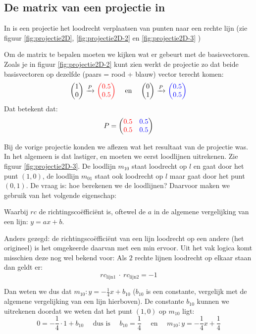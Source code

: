 \subsection{De matrix van een projectie in \RT} \label{projectie2D}
In \RT is een projectie  het loodrecht verplaatsen van punten   naar een rechte lijn (zie figuur \ref{fig:projectie2D},  \ref{fig:projectie2D-2} en \ref{fig:projectie2D-3} ) 


Om de matrix te bepalen moeten we kijken wat er gebeurt met de basisvectoren. 	
Zoals je in figuur \ref{fig:projectie2D-2} kunt zien werkt de projectie zo dat beide basisvectoren op dezelfde (paars = rood + blauw) vector terecht komen:
\[
    \vectwee{1}{0} \ \xrightarrow{P} \ \vectwee[red]{0.5}{0.5} \quad \text{ en } \quad 
    \vectwee{0}{1} \ \xrightarrow{P} \ \vectwee[blue]{0.5}{0.5}
\]
Dat betekent dat: \[P = \begin{pmatrix} {\color{red}0.5}&{\color{blue}0.5} \\ {\color{red}0.5}&{\color{blue}0.5} \end{pmatrix} \]

\newpage
{}

Bij de vorige projectie konden we aflezen wat het resultaat van de projectie was. In het algemeen is dat lastiger, en moeten we eerst loodlijnen uitrekenen. Zie figuur  \ref{fig:projectie2D-3}. De loodlijn $ m_{10} $ staat loodrecht op $l$ en gaat door het punt $(1,0)$, de loodlijn $m_{01}$ staat ook loodrecht op $l$ maar gaat door het punt $(0,1)$. De vraag is: hoe berekenen we de loodlijnen? Daarvoor maken we gebruik van het volgende eigenschap:

\myeig[rc loodlijn]{\[rc_{loodlijn} = \dfrac{-1}{rc_{origineel}}\]} 

Waarbij $rc$ de richtingscoëfficiënt is, oftewel de $a$ in de algemene vergelijking van een lijn: $y=ax+b$.

Anders gezegd: de richtingscoëfficiënt van een lijn loodrecht op een andere (het origineel) is het omgekeerde daarvan met een min ervoor. Uit het vak logica komt misschien deze nog wel bekend voor: Als $2$ rechte lijnen loodrecht op elkaar staan dan geldt er:
\[rc_{\text{lijn}1}\ \cdot\ rc_{\text{lijn}2} = -1\]

Dan weten we dus dat $m_{10}: y= -\frac{1}{4}x+b_{10}$ ($b_{10}$ is een constante, vergelijk met de algemene vergelijking van een lijn hierboven). De constante $b_{10}$ kunnen we uitrekenen doordat we weten dat het punt $(1,0)$ op $m_{10}$ ligt:  \[0 = -\frac{1}{4}\cdot 1 + b_{10}\quad \text{ dus is } \quad b_{10}= \frac{1}{4}\quad \text{ en } \quad m_{10}: y=-\frac{1}{4}x+\frac{1}{4}\] 
 
